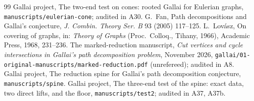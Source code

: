 \documentclass[11pt]{amsart}
\theoremstyle{definition}
\theoremstyle{remark}
\renewcommand{\_}{\oldunderscore\allowbreak}
\begin{document}
\begin{thebibliography}{99}
 Gallai project, The two-end test on cones: rooted Gallai for Eulerian graphs,
\texttt{manuscripts/eulerian-cone}; audited in A30.
 G.~Fan, Path decompositions and Gallai's conjecture, \emph{J. Combin. Theory Ser. B}
93 (2005) 117--125.
 L.~Lov\'asz, On covering of graphs, in: \emph{Theory of Graphs} (Proc.\ Colloq., Tihany,
1966), Academic Press, 1968, 231--236.
 The marked-reduction manuscript, \emph{Cut vertices and cycle intersections in Gallai's
path decomposition problem}, November 2026, \texttt{gallai/01-original-manuscripts/marked-reduction.pdf}
(unrefereed); audited in A8.
 Gallai project, The reduction spine for Gallai's path decomposition conjecture,
\texttt{manuscripts/spine}.
 Gallai project, The three-end test of the spine: exact data, two direct lifts, and the
floor, \texttt{manuscripts/test2}; audited in A37, A37b.
\end{thebibliography}
\end{document}
